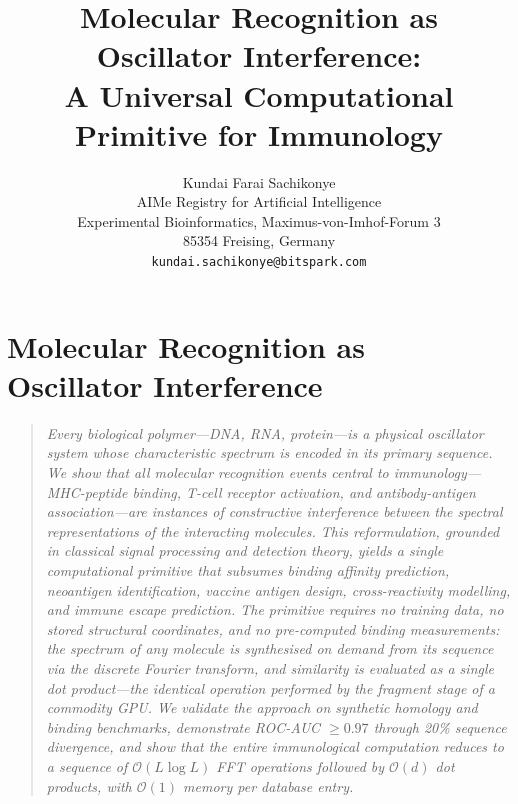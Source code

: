 
\chapter{Molecular Recognition as Oscillator Interference}
\label{im:ch:immunology-primitive}

\begin{quote}\small\itshape
Every biological polymer---DNA, RNA, protein---is a physical oscillator
system whose characteristic spectrum is encoded in its primary sequence.
We show that all molecular recognition events central to immunology---MHC-peptide
binding, T-cell receptor activation, and antibody-antigen association---are
instances of constructive interference between the spectral representations of
the interacting molecules. This reformulation, grounded in classical signal
processing and detection theory, yields a single computational primitive that
subsumes binding affinity prediction, neoantigen identification, vaccine antigen
design, cross-reactivity modelling, and immune escape prediction. The primitive
requires no training data, no stored structural coordinates, and no pre-computed
binding measurements: the spectrum of any molecule is synthesised on demand from
its sequence via the discrete Fourier transform, and similarity is evaluated as
a single dot product---the identical operation performed by the fragment stage
of a commodity GPU. We validate the approach on synthetic homology and binding
benchmarks, demonstrate ROC-AUC $\geq 0.97$ through 20\% sequence divergence,
and show that the entire immunological computation reduces to a sequence of
$\mathcal{O}(L\log L)$ FFT operations followed by $\mathcal{O}(d)$ dot
products, with $\mathcal{O}(1)$ memory per database entry.
\end{quote}

\title{\textbf{Molecular Recognition as Oscillator Interference:\\
A Universal Computational Primitive for Immunology}}

\author{
Kundai Farai Sachikonye\\[0.3em]
AIMe Registry for Artificial Intelligence\\
Experimental Bioinformatics, Maximus-von-Imhof-Forum 3\\
85354 Freising, Germany\\
\texttt{kundai.sachikonye@bitspark.com}
}

